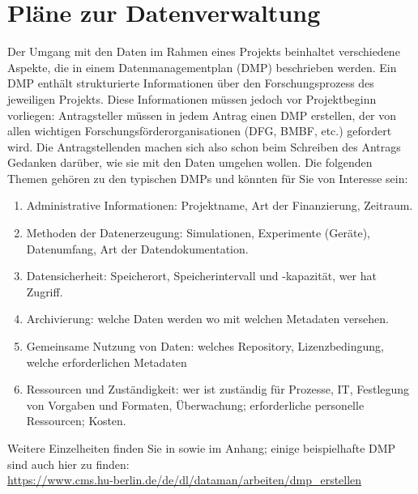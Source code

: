 \section{Pläne zur Datenverwaltung}

Der Umgang mit den Daten im Rahmen eines Projekts beinhaltet verschiedene
Aspekte, die in einem Datenmanagementplan (DMP) beschrieben werden. Ein DMP
enthält strukturierte Informationen über den Forschungsprozess des jeweiligen
Projekts. Diese Informationen müssen jedoch vor Projektbeginn vorliegen:
Antragsteller müssen in jedem Antrag einen DMP erstellen, der von allen
wichtigen Forschungsförderorganisationen (DFG, BMBF, etc.) gefordert wird.
Die Antragstellenden machen sich also schon beim Schreiben des Antrags Gedanken
darüber, wie sie mit den Daten umgehen wollen. Die folgenden Themen gehören zu
den typischen DMPs und könnten für Sie von Interesse sein:
\begin{enumerate}
  \item Administrative Informationen: Projektname, Art der Finanzierung, Zeitraum.
  \item Methoden der Datenerzeugung: Simulationen, Experimente (Geräte),
        Datenumfang, Art der Datendokumentation.
  \item Datensicherheit: Speicherort, Speicherintervall und -kapazität,
        wer hat Zugriff.
  \item Archivierung: welche Daten werden wo mit welchen Metadaten versehen.
  \item Gemeinsame Nutzung von Daten: welches Repository, Lizenzbedingung,
        welche erforderlichen Metadaten
  \item Ressourcen und Zuständigkeit: wer ist zuständig für Prozesse, IT,
        Festlegung von Vorgaben und Formaten, Überwachung; erforderliche
        personelle Ressourcen; Kosten.
\end{enumerate}
Weitere Einzelheiten finden Sie in \cite{dfg2021,hannover2020} sowie im Anhang; einige beispielhafte DMP sind auch hier zu finden: \\
\url{https://www.cms.hu-berlin.de/de/dl/dataman/arbeiten/dmp_erstellen}
